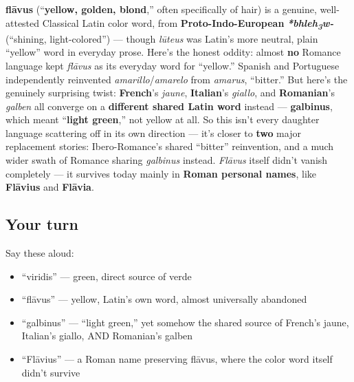 \begin{cousinweb}
\textbf{flāvus} (\textquotedblleft{}\textbf{yellow, golden, blond},\textquotedblright{} often specifically of hair) is a genuine, well-attested Classical Latin color word, from \textbf{Proto-Indo-European} \emph{\textbf{*bhleh\textsubscript{3}w-}} (\textquotedblleft{}shining, light-colored\textquotedblright{}) — though \emph{lūteus} was Latin's more neutral, plain \textquotedblleft{}yellow\textquotedblright{} word in everyday prose. Here's the honest oddity: almost \textbf{no} Romance language kept \emph{flāvus} as its everyday word for \textquotedblleft{}yellow.\textquotedblright{} Spanish and Portuguese independently reinvented \emph{amarillo}/\emph{amarelo} from \emph{amarus}, \textquotedblleft{}bitter.\textquotedblright{} But here's the genuinely surprising twist: \textbf{French}'s \emph{jaune}, \textbf{Italian}'s \emph{giallo}, and \textbf{Romanian}'s \emph{galben} all converge on a \textbf{different shared Latin word} instead — \textbf{galbinus}, which meant \textquotedblleft{}\textbf{light green},\textquotedblright{} not yellow at all. So this isn't every daughter language scattering off in its own direction — it's closer to \textbf{two} major replacement stories: Ibero-Romance's shared \textquotedblleft{}bitter\textquotedblright{} reinvention, and a much wider swath of Romance sharing \emph{galbinus} instead. \emph{Flāvus} itself didn't vanish completely — it survives today mainly in \textbf{Roman personal names}, like \textbf{Flāvius} and \textbf{Flāvia}.
\end{cousinweb}

\subsection*{Your turn}
Say these aloud:

\begin{itemize}
\raggedright
  \item \textquotedblleft{}viridis\textquotedblright{} — green, direct source of verde
  \item \textquotedblleft{}flāvus\textquotedblright{} — yellow, Latin's own word, almost universally abandoned
  \item \textquotedblleft{}galbinus\textquotedblright{} — \textquotedblleft{}light green,\textquotedblright{} yet somehow the shared source of French's jaune, Italian's giallo, AND Romanian's galben
  \item \textquotedblleft{}Flāvius\textquotedblright{} — a Roman name preserving flāvus, where the color word itself didn't survive
\end{itemize}

